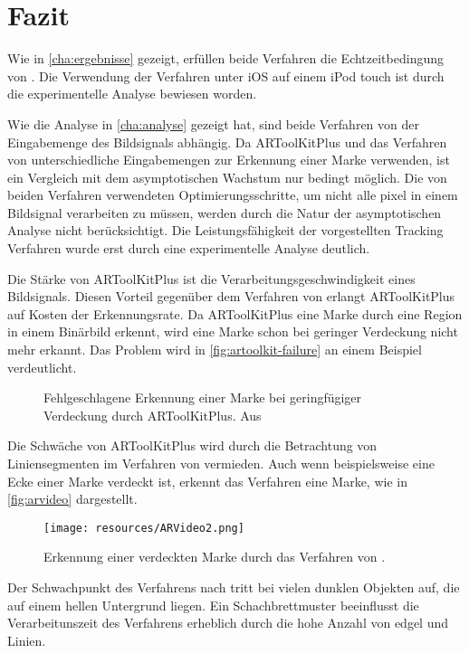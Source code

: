 \chapter{Fazit} %
\label{cha:fazit}

Wie in \autoref{cha:ergebnisse} gezeigt, erfüllen beide Verfahren die Echtzeitbedingung von \citeauthor{azuma97}. Die
 Verwendung der Verfahren unter iOS auf einem iPod touch ist durch die experimentelle Analyse bewiesen worden.

Wie die Analyse in \autoref{cha:analyse} gezeigt hat, sind beide Verfahren von der Eingabemenge des Bildsignals
 abhängig. Da ARToolKitPlus und das Verfahren von \citeauthor{hirzer08} unterschiedliche Eingabemengen zur Erkennung
 einer Marke verwenden, ist ein Vergleich mit dem asymptotischen Wachstum nur bedingt möglich. Die von beiden Verfahren
 verwendeten Optimierungsschritte, um nicht alle \gls{pixel} in einem Bildsignal verarbeiten zu müssen, werden durch
 die Natur der asymptotischen Analyse nicht berücksichtigt. Die Leistungsfähigkeit der vorgestellten Tracking Verfahren
 wurde erst durch eine experimentelle Analyse deutlich.

Die Stärke von ARToolKitPlus ist die Verarbeitungsgeschwindigkeit eines Bildsignals. Diesen Vorteil gegenüber dem
 Verfahren von \citeauthor{hirzer08} erlangt ARToolKitPlus auf Kosten der Erkennungsrate. Da ARToolKitPlus eine Marke
 durch eine Region in einem Binärbild erkennt, wird eine Marke schon bei geringer Verdeckung nicht mehr erkannt. Das
 Problem wird in \autoref{fig:artoolkit-failure} an einem Beispiel verdeutlicht.
\begin{figure}[!ht]
	\centering
	\caption{Fehlgeschlagene Erkennung einer Marke bei geringfügiger Verdeckung durch ARToolKitPlus. Aus
	 \cite{fiala2004artagb}}
	\label{fig:artoolkit-failure}
\end{figure}

Die Schwäche von ARToolKitPlus wird durch die Betrachtung von Liniensegmenten im Verfahren von \citeauthor{hirzer08}
 vermieden. Auch wenn beispielsweise eine Ecke einer Marke verdeckt ist, erkennt das Verfahren eine Marke, wie in
 \autoref{fig:arvideo} dargestellt.
\begin{figure}[!ht]
	\centering
	\texttt{[image: resources/ARVideo2.png]}
	\caption{Erkennung einer verdeckten Marke durch das Verfahren von \citeauthor{hirzer08}.}
	\label{fig:arvideo}
\end{figure}
Der Schwachpunkt des Verfahrens nach \citeauthor{hirzer08} tritt bei vielen dunklen Objekten auf, die auf einem hellen
 Untergrund liegen. Ein Schachbrettmuster beeinflusst die Verarbeitunszeit des Verfahrens erheblich durch die hohe
 Anzahl von \gls{edgel} und Linien.

